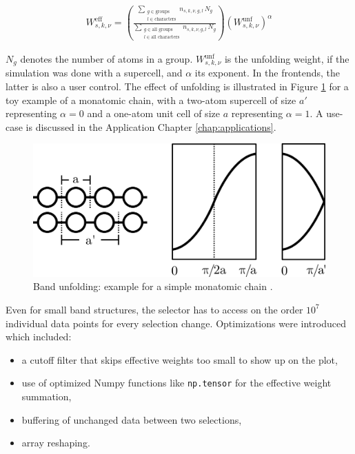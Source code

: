 \begin{align}
  W^{\text{eff}}_{s,k,\nu} = \left( \frac{\sum\limits_{\substack{g \in \text{groups} \\ l \in \text{characters}}} n_{s,k,\nu,g,l}\, N_g}{\sum\limits_{\substack{g \in \text{all groups} \\ l \in \text{all characters}}} n_{s,k,\nu,g,l}\, N_g} \right) \left(W_{s,k,\nu}^{\text{unf}}\right)^\alpha
\label{eq:effective-weight}
\end{align}

\(N_g\) denotes the number of atoms in a group. \(W_{s,k,\nu}^{\text{unf}}\) is
the unfolding weight, if the simulation was done with a supercell, and
\(\alpha\) its exponent. In the frontends, the latter is also a user control.
The effect of unfolding is illustrated in Figure \ref{fig:unfolding} for a toy
example of a monatomic chain, with a two-atom supercell of size \(a'\)
representing \(\alpha=0\) and a one-atom unit cell of size \(a\) representing
\(\alpha=1\). A use-case is discussed in the Application Chapter
\ref{chap:applications}.

\begin{figure}[htb!]
    \centering
    \includegraphics[width=0.6\linewidth]{fig/unfolding.png}
    \caption[Band Unfolding]{Band unfolding: example for a simple monatomic
      chain \cite{hoffmann1987chemistry}.}
    \label{fig:unfolding}
\end{figure}

Even for small band structures, the selector has to access on the order \(10^7\)
individual data points for every selection change. Optimizations were introduced
which included:
\begin{itemize}
\item a cutoff filter that skips effective weights too small to show up on the
    plot,
\item use of optimized Numpy functions like \texttt{np.tensor} for the
    effective weight summation,
\item buffering of unchanged data between two selections,
\item array reshaping.
\end{itemize}

